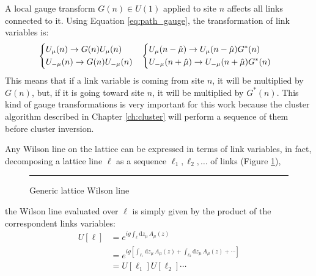 A local gauge transform $G(n) \in U(1)$ applied to site $n$ affects all links connected to it.
Using Equation \eqref{eq:path_gauge}, the transformation of link variables is:
\begin{equation}\label{eq:site_gauge}
    \begin{aligned}
        &\begin{dcases}
        U_\mu(n) \rightarrow G(n)U_\mu(n) \\
        U_{-\mu}(n) \rightarrow G(n)U_{-\mu}(n)
        \end{dcases}%
        &%
        \begin{dcases}
        U_\mu(n-\hat\mu) \rightarrow U_\mu(n-\hat\mu)G^*(n) \\
        U_{-\mu}(n+\hat\mu) \rightarrow U_{-\mu}(n+\hat\mu)G^*(n)
        \end{dcases}&
    \end{aligned}
\end{equation}
This means that if a link variable is coming from site $n$, it will be multiplied by $G(n)$, but,
if it is going toward site $n$, it will be multiplied by $G^*(n)$.
This kind of gauge transformations is very important for this work because the cluster algorithm described in Chapter \ref{ch:cluster}
will perform a sequence of them before cluster inversion.

Any Wilson line on the lattice can be expressed in terms of link variables,
in fact, decomposing a lattice line $\ell$ as a sequence $\ell_1, \ell_2, \ldots$ of links (Figure \ref{fig:line}),
\begin{figure}[!htb]
    \centering
    \rule{3in}{1.5in}
    \caption{Generic lattice Wilson line}
    \label{fig:line}
\end{figure}
the Wilson line evaluated over $\ell$ is simply given by the product of the correspondent links variables:
\begin{align*}
    U[\ell] &= e^{ig\int_\ell\mathrm dz_\mu\,A_\mu(z)} \\
            &= e^{ig\left[\int_{\ell_1}\mathrm dz_\mu\,A_\mu(z) + \int_{\ell_2}\mathrm dz_\mu\,A_\mu(z) + \cdots \right]} \\
            &= U[\ell_1]U[\ell_2] \cdots
\end{align*}

